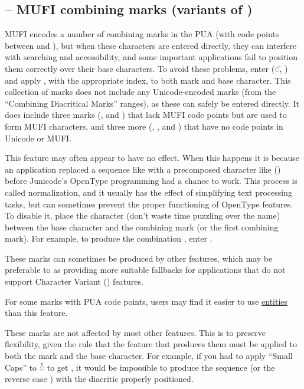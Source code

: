\subsection{ -- MUFI combining marks (variants of )}
MUFI encodes a number of combining marks in the PUA (with code points between  and ), but when these characters
are entered directly, they can interfere with searching and accessibility, and some important applications fail to
position them correctly over their base characters. To avoid these problems, enter  (◌̄, ) and apply , with the appropriate index, to both mark and base character. This
collection of marks does not include any Unicode-encoded marks (from the ``Combining Diacritical Marks'' ranges), as
these can safely be entered directly. It does include three marks (,
\textSourceText{[31]} and \textSourceText{[32]}) that lack MUFI code points but are used to form MUFI
characters, and three more (\textSourceText{[2]}, \textSourceText{[33]},
and \textSourceText{[34]}) that have no code points in Unicode or MUFI.

This feature may often appear to have no effect. When this happens it is because
an application replaced a sequence like  with a precomposed character
like  () before Junicode's OpenType programming had a chance to work.
This process is called normalization, and it usually has the effect of simplifying
text processing tasks, but can sometimes prevent the proper functioning of OpenType
features. To disable it, place the character   (don't waste time puzzling over the name) between the base
character and the combining mark (or the first combining mark). For example, to produce
the combination , enter .

These marks can sometimes be produced by other  features, which may be preferable to
 as providing more suitable fallbacks for applications that do not support Character Variant
() features.

For some marks with PUA code points, users may find it easier to use \hyperlink{ss10}{entities} than this feature.

These marks are not affected by most other features. This is to preserve flexibility, given the rule that the feature
that produces them must be applied to both the mark and the base character. For example, if you had to
apply  ``Small Caps'' to  ◌͏ᷨ to get
 , it would be impossible to produce the sequence
(or the reverse case )
with the diacritic properly positioned.

